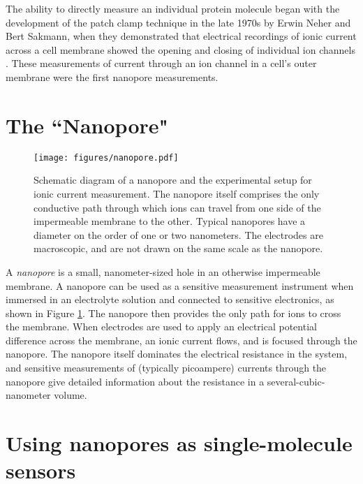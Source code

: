 The ability to directly measure an individual protein molecule began with the development of the patch clamp technique in the late 1970s by Erwin Neher and Bert Sakmann, when they demonstrated that electrical recordings of ionic current across a cell membrane showed the opening and closing of individual ion channels \citep{Neher1976}.  These measurements of current through an ion channel in a cell's outer membrane were the first nanopore measurements.

\section{The ``Nanopore"}

\begin{figure}[h]
\begin{centering}
\texttt{[image: figures/nanopore.pdf]}
\caption[The nanopore setup]{Schematic diagram of a nanopore and the experimental setup for ionic current measurement.  The nanopore itself comprises the only conductive path through which ions can travel from one side of the impermeable membrane to the other.  Typical nanopores have a diameter on the order of one or two nanometers.  The electrodes are macroscopic, and are not drawn on the same scale as the nanopore.}
\label{fig:nanopore}
\end{centering}
\end{figure}

A \textit{nanopore} is a small, nanometer-sized hole in an otherwise impermeable membrane.  A nanopore can be used as a sensitive measurement instrument when immersed in an electrolyte solution and connected to sensitive electronics, as shown in Figure \ref{fig:nanopore}.  The nanopore then provides the only path for ions to cross the membrane.  When electrodes are used to apply an electrical potential difference across the membrane, an ionic current flows, and is focused through the nanopore.  The nanopore itself dominates the electrical resistance in the system, and sensitive measurements of (typically picoampere) currents through the nanopore give detailed information about the resistance in a several-cubic-nanometer volume.


\section{Using nanopores as single-molecule sensors}

